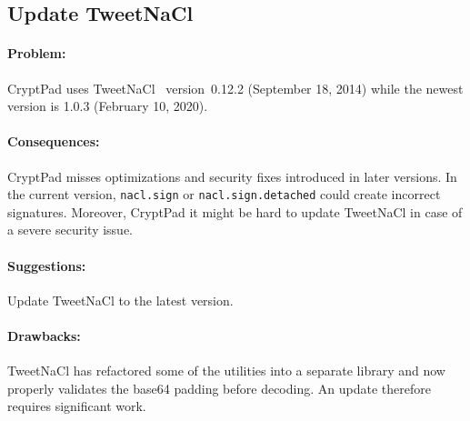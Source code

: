 \subsection{Update TweetNaCl}

\paragraph{Problem:} CryptPad uses TweetNaCl~\cite{Bernstein2015,Chestnykhm2016} version~0.12.2 (September 18, 2014) while the newest version is 1.0.3 (February 10, 2020).

\paragraph{Consequences:} CryptPad misses optimizations and security fixes introduced in later versions.
In the current version, \texttt{nacl.sign} or \texttt{nacl.sign.detached} could create incorrect signatures.
Moreover, CryptPad it might be hard to update TweetNaCl in case of a severe security issue.

\paragraph{Suggestions:} Update TweetNaCl to the latest version.

\paragraph{Drawbacks:}
TweetNaCl has refactored some of the utilities into a separate library and now properly validates the base64 padding before decoding.
An update therefore requires significant work.
